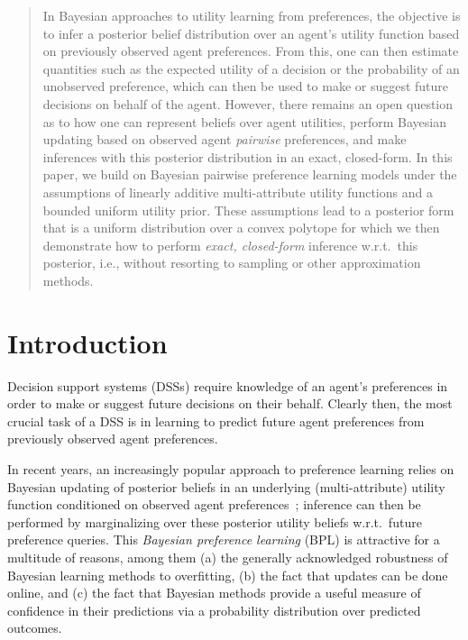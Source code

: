 \documentclass{article} %
\begin{document}
\begin{abstract}
In Bayesian approaches to utility learning from preferences, the
objective is to infer a posterior belief distribution over an agent's
utility function based on previously observed agent preferences.  From
this, one can then estimate quantities such as the expected utility of
a decision or the probability of an unobserved preference,
which can then be used to make or suggest future decisions on behalf
of the agent.  However, there remains an open question as to how one
can represent beliefs over agent utilities, perform Bayesian updating
based on observed agent \emph{pairwise} preferences, and make
inferences with this posterior distribution in an exact, closed-form.
In this paper, we build on Bayesian pairwise preference learning
models under the assumptions of linearly 
additive multi-attribute utility functions and a bounded uniform
utility prior.  These assumptions lead to a posterior form that is a
uniform distribution over a convex polytope for which we then
demonstrate how to perform \emph{exact, closed-form} inference w.r.t.\
this posterior, i.e., without resorting to sampling or
other approximation methods.
\end{abstract}

\section{Introduction}

\label{sec:intro}

Decision support systems (DSSs) require knowledge of an agent's
preferences in order to make or suggest future decisions on their
behalf.  Clearly then, the most crucial task of a DSS is in learning to
predict future agent preferences from previously observed agent preferences.

In recent years, an increasingly popular approach to preference
learning relies on Bayesian updating of posterior beliefs in an
underlying (multi-attribute) utility function conditioned on observed
agent
preferences~\cite{Chajewska00utilitiesas,Chajewska01learningan,boutilier02239,zoubin_gp,sanner:aistats10,viappiani_nips};
inference can then be performed by marginalizing over these posterior
utility beliefs w.r.t.\ future preference queries.  This \emph{Bayesian
preference learning} (BPL) is attractive for a multitude of reasons,
among them (a) the generally acknowledged robustness of Bayesian
learning methods to overfitting, (b) the fact that updates can be done
online, and (c) the fact that Bayesian methods provide a useful
measure of confidence in their predictions via a probability
distribution over predicted outcomes.
\end{document}
